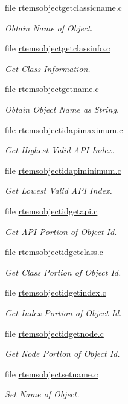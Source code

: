 \begin{DoxyCompactItemize}
file \mbox{\hyperlink{rtemsobjectgetclassicname_8c}{rtemsobjectgetclassicname.\+c}}
\begin{DoxyCompactList}\small\item\em Obtain Name of Object. \end{DoxyCompactList}\item 
file \mbox{\hyperlink{rtemsobjectgetclassinfo_8c}{rtemsobjectgetclassinfo.\+c}}
\begin{DoxyCompactList}\small\item\em Get Class Information. \end{DoxyCompactList}\item 
file \mbox{\hyperlink{rtemsobjectgetname_8c}{rtemsobjectgetname.\+c}}
\begin{DoxyCompactList}\small\item\em Obtain Object Name as String. \end{DoxyCompactList}\item 
file \mbox{\hyperlink{rtemsobjectidapimaximum_8c}{rtemsobjectidapimaximum.\+c}}
\begin{DoxyCompactList}\small\item\em Get Highest Valid A\+PI Index. \end{DoxyCompactList}\item 
file \mbox{\hyperlink{rtemsobjectidapiminimum_8c}{rtemsobjectidapiminimum.\+c}}
\begin{DoxyCompactList}\small\item\em Get Lowest Valid A\+PI Index. \end{DoxyCompactList}\item 
file \mbox{\hyperlink{rtemsobjectidgetapi_8c}{rtemsobjectidgetapi.\+c}}
\begin{DoxyCompactList}\small\item\em Get A\+PI Portion of Object Id. \end{DoxyCompactList}\item 
file \mbox{\hyperlink{rtemsobjectidgetclass_8c}{rtemsobjectidgetclass.\+c}}
\begin{DoxyCompactList}\small\item\em Get Class Portion of Object Id. \end{DoxyCompactList}\item 
file \mbox{\hyperlink{rtemsobjectidgetindex_8c}{rtemsobjectidgetindex.\+c}}
\begin{DoxyCompactList}\small\item\em Get Index Portion of Object Id. \end{DoxyCompactList}\item 
file \mbox{\hyperlink{rtemsobjectidgetnode_8c}{rtemsobjectidgetnode.\+c}}
\begin{DoxyCompactList}\small\item\em Get Node Portion of Object Id. \end{DoxyCompactList}\item 
file \mbox{\hyperlink{rtemsobjectsetname_8c}{rtemsobjectsetname.\+c}}
\begin{DoxyCompactList}\small\item\em Set Name of Object. \end{DoxyCompactList}\end{DoxyCompactItemize}
